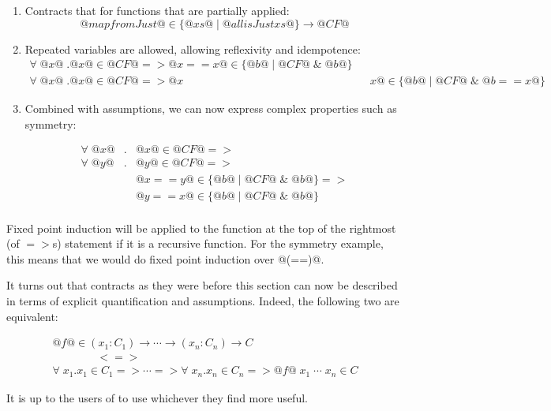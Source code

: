 \begin{enumerate}
  \item Contracts that for functions that are partially applied:
    $$@map fromJust@ \in \{ @xs@ \mid @all isJust xs@ \} \to @CF@$$

  \item Repeated variables are allowed, allowing reflexivity and
    idempotence:
    \[\begin{array}{l}
    \forall \; @x@ \; . @x@ \in @CF@ => @x == x@ \in \{ @b@ \mid @CF@ \; \& \; @b@ \} \\
    \forall \; @x@ \; . @x@ \in @CF@ => @x && x@ \in \{ @b@ \mid @CF@ \; \& \; @b == x@ \}
    \end{array}\]

  \item Combined with assumptions, we can now express complex
      properties such as symmetry:

    \[\begin{array}{rcl}
    \forall \; @x@ & . & @x@ \in @CF@ => \\
    \forall \; @y@ & . & @y@ \in @CF@ => \\
                   &   & @x == y@ \in \{ @b@ \mid @CF@ \; \& \; @b@ \} => \\
                   &   & @y == x@ \in \{ @b@ \mid @CF@ \; \& \; @b@ \}    \\
    \end{array}\]

\end{enumerate}

Fixed point induction will be applied to the function at the top of
the rightmost (of $=>$s) statement if it is a recursive function. For
the symmetry example, this means that we would do fixed point induction
over @(==)@.

It turns out that contracts as they were before this section can now
be described in terms of explicit quantification and
assumptions. Indeed, the following two are equivalent:

\[\begin{array}{l}
@f@ \in (x_1 : C_1) \to \cdots \to (x_n : C_n) \to C
\\ \qquad\qquad <=> \\
\forall \; x_1 . x_1 \in C_1 => \cdots =>
\forall \; x_n . x_n \in C_n =>
    @f@ \; x_1 \; \cdots \; x_n \in C
\end{array}\]

It is up to the users of to use whichever they find more useful.

